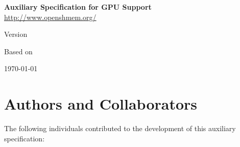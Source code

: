 \documentclass[10pt,oneside]{book}
\begin{document}
\hypersetup{pageanchor=true,citecolor=blue}

\pagestyle{fancy}
\fancyhead{}
\fancyhead[L]{\insertDocVersion}
\fancyfoot[C]{\thepage}


\thispagestyle{empty}
\begin{center}
\textbf{\Huge \openshmem}
\par
\end{center}

\begin{center}
\textbf{\LARGE Auxiliary Specification for GPU Support}\\
\vspace{1em}
\url{http://www.openshmem.org/}
\par
\end{center}

\begin{center}
Version \insertDocVersion
\par
\end{center}

\vspace{0.5in}
\begin{center}
Based on 
\end{center}

\vspace{0.5in}
\begin{center}
\today
\end{center}

\vfill{}

\pagebreak{}

\section*{Authors and Collaborators}

The following individuals contributed to the development of this auxiliary
specification:
\end{document}
